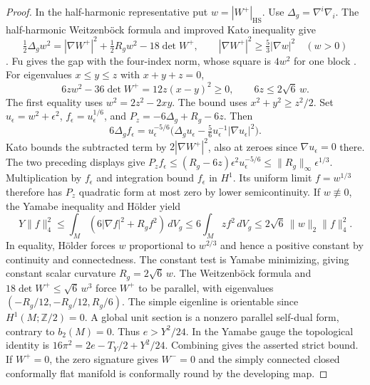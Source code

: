 \begin{proof}
In the half-harmonic representative put \(w=|W^+|_{\mathrm{HS}}\).
Use \(\Delta_g=\nabla^i\nabla_i\). The half-harmonic
Weitzenb\"ock formula and improved Kato inequality give
\[
 \tfrac12\Delta_g w^2=|\nabla W^+|^2+\tfrac12R_g w^2-18\det W^+,
 \qquad |\nabla W^+|^2\ge\tfrac53|\nabla w|^2\quad(w>0)
\]
\cite[equations (3.3), (3.7) and Corollary 3.4]{GurskyMcKeownTyrrell2026}.
Fu gives the gap with the four-index norm, whose square is
\(4w^2\) for one block
\cite[Proposition E, equations (2-1)--(2-9)]{Fu2018FourManifolds}.
For eigenvalues \(x\le y\le z\) with \(x+y+z=0\),
\[
 6zw^2-36\det W^+=12z(x-y)^2\ge0,\qquad
 6z\le 2\sqrt6\,w.
\]
The first equality uses \(w^2=2z^2-2xy\). The bound uses
\(x^2+y^2\ge z^2/2\).
Set \(u_\epsilon=w^2+\epsilon^2\),
\(f_\epsilon=u_\epsilon^{1/6}\), and \(P_z=-6\Delta_g+R_g-6z\).
Then
\[
 6\Delta_g f_\epsilon=u_\epsilon^{-5/6}
   \bigl(\Delta_g u_\epsilon-\tfrac56u_\epsilon^{-1}
                            |\nabla u_\epsilon|^2\bigr).
\]
Kato bounds the subtracted term by \(2|\nabla W^+|^2\), also
at zeroes since \(\nabla u_\epsilon=0\) there. The two preceding
displays give
\(P_z f_\epsilon\le(R_g-6z)\epsilon^2 u_\epsilon^{-5/6}
\le\|R_g\|_\infty\epsilon^{1/3}\).
Multiplication by \(f_\epsilon\) and integration bound
\(f_\epsilon\) in \(H^1\). Its uniform limit \(f=w^{1/3}\)
therefore has \(P_z\) quadratic form at most zero by lower
semicontinuity. If \(w\not\equiv0\), the Yamabe inequality
and Hölder yield
\[
 Y\|f\|_4^2
 \le \int_M(6|\nabla f|^2+R_g f^2)\,dV_g
 \le 6\int_M zf^2\,dV_g
 \le 2\sqrt6\,\|w\|_2\|f\|_4^2.
\]
In equality, Hölder forces \(w\) proportional to \(w^{2/3}\)
and hence a positive constant by continuity and connectedness.
The constant test is Yamabe minimizing, giving constant scalar
curvature \(R_g=2\sqrt6\,w\). The Weitzenb\"ock formula and
\(18\det W^+\le\sqrt6\,w^3\) force \(W^+\) to be parallel,
with eigenvalues \((-R_g/12,-R_g/12,R_g/6)\). The simple
eigenline is orientable since \(H^1(M;\mathbb Z/2)=0\).
A global unit section is a nonzero parallel self-dual form,
contrary to \(b_2(M)=0\). Thus \(e>Y^2/24\).
In the Yamabe gauge the topological identity is
\(16\pi^2=2e-T_Y/2+Y^2/24\). Combining gives the asserted
strict bound. If \(W^+=0\), the zero signature gives \(W^-=0\)
and the simply connected closed conformally flat manifold is
conformally round by the developing map.


\end{proof}
